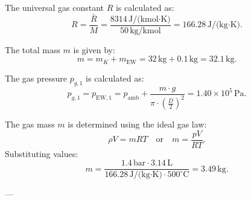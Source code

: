 The universal gas constant \( R \) is calculated as:  
\[
R = \frac{\bar{R}}{M} = \frac{8314 \, \text{J/(kmol·K)}}{50 \, \text{kg/kmol}} = 166.28 \, \text{J/(kg·K)}.
\]  

The total mass \( m \) is given by:  
\[
m = m_K + m_{\text{EW}} = 32 \, \text{kg} + 0.1 \, \text{kg} = 32.1 \, \text{kg}.
\]  

The gas pressure \( p_{g,1} \) is calculated as:  
\[
p_{g,1} = p_{\text{EW},1} = p_{\text{amb}} + \frac{m \cdot g}{\pi \cdot \left(\frac{D}{2}\right)^2} = 1.40 \times 10^5 \, \text{Pa}.
\]  

The gas mass \( m \) is determined using the ideal gas law:  
\[
\rho V = mRT \quad \text{or} \quad m = \frac{pV}{RT}.
\]  
Substituting values:  
\[
m = \frac{1.4 \, \text{bar} \cdot 3.14 \, \text{L}}{166.28 \, \text{J/(kg·K)} \cdot 500^\circ\text{C}} = 3.49 \, \text{kg}.
\]  

---